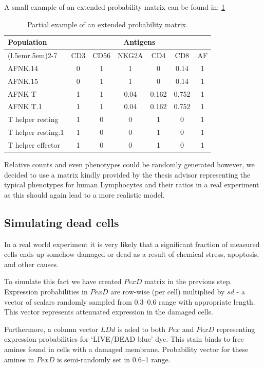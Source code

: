   A small example of an extended probability matrix can be found in: \cref{tab:ex_prob}
  

\begin{table}[]\small\sf
\label{tab:ex_prob}
\begin{tabular}{lcccccc} \toprule 
\multirow{2}{*}{Population}  & \multicolumn{6}{c}{Antigens}\\ 
\cmidrule(l{.5em}r{.5em}){2-7}
{} & CD3 & CD56 & NKG2A  & CD4   & CD8   & AF\\
\midrule
AFNK.14          & 0   & 1    & 1     & 0     & 0.14  & 1  \\
AFNK.15          & 0   & 1    & 1     & 0     & 0.14  & 1  \\
AFNK T           & 1   & 1    & 0.04  & 0.162 & 0.752 & 1  \\
AFNK T.1         & 1   & 1    & 0.04  & 0.162 & 0.752 & 1  \\
T helper resting   & 1   & 0    & 0     & 1     & 0     & 1  \\
T helper resting.1 & 1   & 0    & 0     & 1     & 0     & 1  \\
T helper effector  & 1   & 0    & 0     & 1     & 0     & 1 \\
 \bottomrule
\end{tabular}
\caption{Partial example of an extended probability matrix.}
\end{table}
  
  Relative counts and even phenotypes could be randomly generated however, we decided to use a matrix kindly provided by the thesis advisor representing the typical phenotypes for human Lymphocytes and their ratios in a real experiment as this should again lead to a more realistic model.
  
  \subsection{Simulating dead cells}
  In a real world experiment it is very likely that a significant fraction of measured cells ends up somehow damaged or dead as a result of chemical stress, apoptosis, and other causes.
  
  To simulate this fact we have created $PexD$ matrix in the previous step. Expression probabilities in $PexD$ are row-wise (per cell) multiplied by $sd$ - a vector of scalars randomly sampled from 0.3--0.6 range with appropriate length. This vector represents attenuated expression in the damaged cells. 
  
  Furthermore, a column vector $LDd$ is aded to both $Pex$ and $PexD$ representing expression probabilities for `LIVE/DEAD blue' dye. This stain binds to free amines found in cells with a damaged membrane. Probability vector for these amines in $PexD$ is semi-randomly set in 0.6--1 range. 
  

